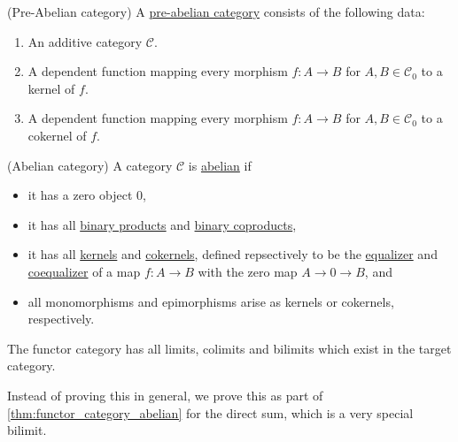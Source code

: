 \begin{definition}{(Pre-Abelian category)}
A \ul{pre-abelian category} consists of the following data:
\begin{enumerate}
\item An additive category $\mathcal{C}$.
\item A dependent function mapping every morphism $f : A \rightarrow B$ for $A, B \in \mathcal{C}_{0}$ to a
kernel of $f$.
\item A dependent function mapping every morphism $f : A \rightarrow B$ for $A, B \in \mathcal{C}_{0}$ to a
cokernel of $f$.
\end{enumerate}
\end{definition}


\begin{definition}{(Abelian category)}
A category $\mathcal{C}$ is \ul{abelian} if
\begin{itemize}
\item it has a zero object $0$,
\item it has all \ul{binary products} and \ul{binary coproducts},
\item it has all \ul{kernels} and \ul{cokernels}, defined repsectively to be the \ul{equalizer} and
\ul{coequalizer} of a map $f : A \rightarrow B$ with the zero map $A \rightarrow 0 \rightarrow B$, and
\item all monomorphisms and epimorphisms arise as kernels or cokernels, respectively.
\end{itemize}
\end{definition}



\begin{theorem}
The functor category has all limits, colimits and bilimits which exist in the target category.
\end{theorem}

Instead of proving this in general, we prove this as part of \ref{thm:functor_category_abelian} for the direct sum, which is a very special bilimit.

